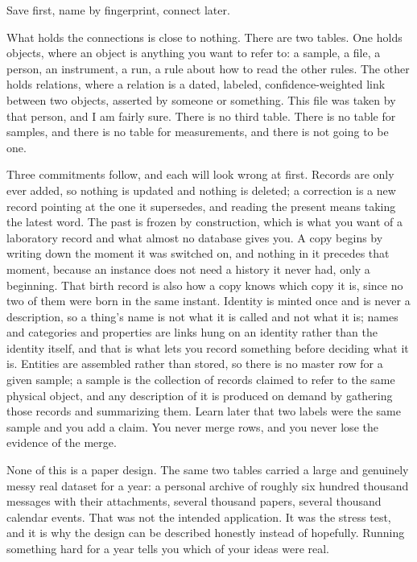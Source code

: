 Save first, name by fingerprint, connect later.

What holds the connections is close to nothing. There are two tables. One holds objects, where an object is anything you want to refer to: a sample, a file, a person, an instrument, a run, a rule about how to read the other rules. The other holds relations, where a relation is a dated, labeled, confidence-weighted link between two objects, asserted by someone or something. This file was taken by that person, and I am fairly sure. There is no third table. There is no table for samples, and there is no table for measurements, and there is not going to be one.

Three commitments follow, and each will look wrong at first. Records are only ever added, so nothing is updated and nothing is deleted; a correction is a new record pointing at the one it supersedes, and reading the present means taking the latest word. The past is frozen by construction, which is what you want of a laboratory record and what almost no database gives you. A copy begins by writing down the moment it was switched on, and nothing in it precedes that moment, because an instance does not need a history it never had, only a beginning. That birth record is also how a copy knows which copy it is, since no two of them were born in the same instant. Identity is minted once and is never a description, so a thing's name is not what it is called and not what it is; names and categories and properties are links hung on an identity rather than the identity itself, and that is what lets you record something before deciding what it is. Entities are assembled rather than stored, so there is no master row for a given sample; a sample is the collection of records claimed to refer to the same physical object, and any description of it is produced on demand by gathering those records and summarizing them. Learn later that two labels were the same sample and you add a claim. You never merge rows, and you never lose the evidence of the merge.

None of this is a paper design. The same two tables carried a large and genuinely messy real dataset for a year: a personal archive of roughly six hundred thousand messages with their attachments, several thousand papers, several thousand calendar events. That was not the intended application. It was the stress test, and it is why the design can be described honestly instead of hopefully. Running something hard for a year tells you which of your ideas were real.

